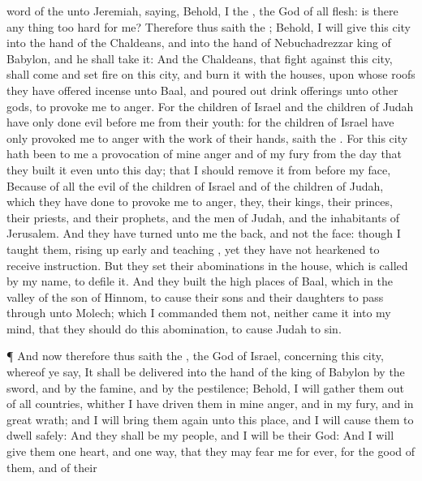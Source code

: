 {word of the
{} unto
Jeremiah,
saying,
Behold, I
{} the
{}, the
God of all
flesh: is there any
thing too
hard for me?
Therefore thus
saith the
{}; Behold, I will
give this
city into the
hand of the
Chaldeans, and into the
hand of
Nebuchadrezzar
king of
Babylon, and he shall
take it:
And the
Chaldeans, that
fight against this
city, shall
come and
set
fire on this
city, and
burn it with the
houses, upon whose
roofs they have offered
incense unto
Baal, and poured
out drink
offerings unto
other
gods, to provoke me to
anger.
For the
children of
Israel and the
children of
Judah have only
done
evil
before me from their
youth: for the
children of
Israel have only provoked me to
anger with the
work of their
hands,
saith the
{}.
For this
city hath been to me
{} a provocation of mine
anger and of my
fury from the
day that they
built it even unto this
day; that I should
remove it from before my
face,
Because of all the
evil of the
children of
Israel and of the
children of
Judah, which they have
done to provoke me to
anger, they, their
kings, their
princes, their
priests, and their
prophets, and the
men of
Judah, and the
inhabitants of
Jerusalem.
And they have
turned unto me the
back, and not the
face: though I
taught them, rising up
early and
teaching
{}, yet they have not
hearkened to
receive
instruction.
But they
set their
abominations in the
house, which is
called by my
name, to
defile it.
And they
built the high
places of
Baal, which
{} in the
valley of the
son of
Hinnom, to cause their
sons and their
daughters to
pass through
{} unto
Molech; which I
commanded them not, neither
came it into my
mind, that they should
do this
abomination, to cause
Judah to
sin.
\par }{\PP {}¶ And now therefore thus
saith the
{}, the
God of
Israel, concerning this
city, whereof ye
say, It shall be
delivered into the
hand of the
king of
Babylon by the
sword, and by the
famine, and by the
pestilence;
Behold, I will gather them
out of all
countries, whither I have
driven them in mine
anger, and in my
fury, and in
great
wrath; and I will bring them
again unto this
place, and I will cause them to
dwell
safely:
And they shall be my
people, and I will be their
God:
And I will
give them
one
heart, and
one
way, that they may
fear me for
ever, for the
good of them, and of their
}
